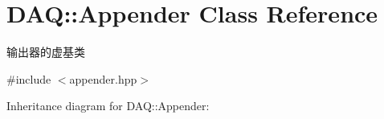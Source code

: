 \hypertarget{classDAQ_1_1Appender}{}\section{D\+AQ\+:\+:Appender Class Reference}
\label{classDAQ_1_1Appender}


输出器的虚基类  




{\ttfamily \#include $<$appender.\+hpp$>$}



Inheritance diagram for D\+AQ\+:\+:Appender\+:
